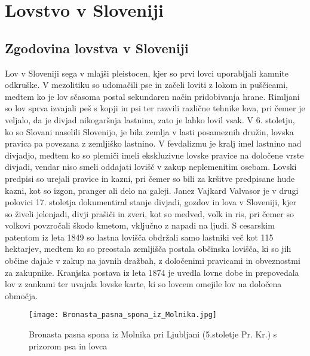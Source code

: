 \documentclass[a4paper,12pt,openright]{book}
\begin{document}
\chapter{Lovstvo v Sloveniji}
\label{zgodovina}

\section{Zgodovina lovstva v Sloveniji}

Lov v Sloveniji sega v mlajši pleistocen, kjer so prvi lovci uporabljali kamnite odkruške.
V mezolitiku so udomačili pse in začeli loviti z lokom in puščicami, medtem ko je lov sčasoma postal sekundaren način pridobivanja hrane.
Rimljani so lov sprva izvajali peš s kopji in psi ter razvili različne tehnike lova, pri čemer je veljalo, da je divjad nikogaršnja lastnina, zato je lahko lovil vsak.\cite{Lov_8_14}
V 6. stoletju, ko so Slovani naselili Slovenijo, je bila zemlja v lasti posameznih družin, lovska pravica pa povezana z zemljiško lastnino.
V fevdalizmu je kralj imel lastnino nad divjadjo, medtem ko so plemiči imeli ekskluzivne lovske pravice na določene vrste divjadi, vendar niso smeli oddajati lovišč v zakup neplemenitim osebam.
Lovski predpisi so urejali pravice in kazni, pri čemer so bili za kršitve predpisane hude kazni, kot so izgon, pranger ali delo na galeji.\cite{Lov_15_34}
Janez Vajkard Valvasor je v drugi polovici 17. stoletja dokumentiral stanje divjadi, gozdov in lova v Sloveniji, kjer so živeli jelenjadi, divji prašiči in zveri, kot so medved, volk in ris, pri čemer so volkovi povzročali škodo kmetom, vključno z napadi na ljudi. 
S cesarskim patentom iz leta 1849 so lastna lovišča obdržali samo lastniki več kot 115 hektarjev, medtem ko so preostala zemljišča postala občinska lovišča, ki so jih občine dajale v zakup na javnih dražbah, z določenimi pravicami in obveznostmi za zakupnike.
Kranjska postava iz leta 1874 je uvedla lovne dobe in prepovedala lov z zankami ter uvajala lovske karte, ki so lovcem omejile lov na določena območja.\cite{Lov_43_55}

\begin{figure}[h!]  
  \centering
  \texttt{[image: Bronasta\_pasna\_spona\_iz\_Molnika.jpg]}  %
  \caption{Bronasta pasna spona iz Molnika pri Ljubljani (5.stoletje Pr. Kr.) s prizorom psa in lovca \cite{pasna_spona_vir}}
  \label{fig:bronasta_pasna_spona}
\end{figure}
\end{document}
